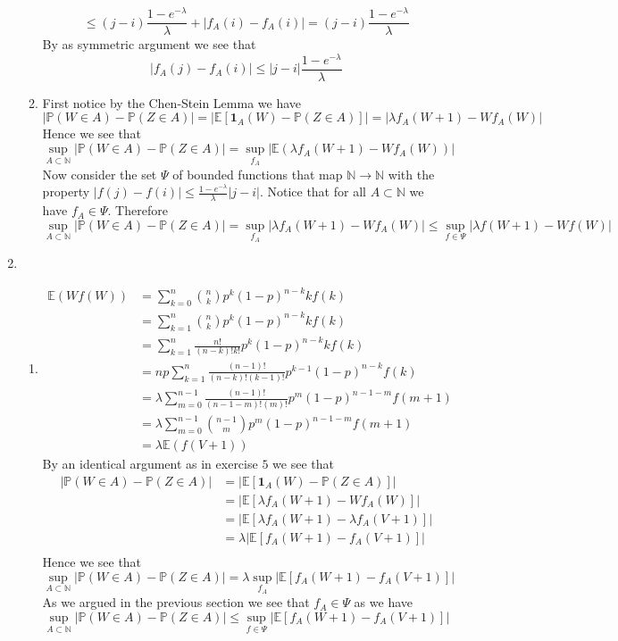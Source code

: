 \documentclass[12pt]{article}  %
\newcommand{\N}{{\mathbb{N}}}
\newcommand{\E}{{\mathbb{E}}}
\newcommand{\prob}{{\mathbb{P}}}
\newcommand{\ind}{{\mathbf{1}}}
\begin{document}
\begin{enumerate}
\begin{enumerate}
$$\leq (j-i)\frac{1-e^{-\lambda}}{\lambda} + |f_A(i)-f_A(i)| = (j-i)\frac{1-e^{-\lambda}}{\lambda}$$
By as symmetric argument we see that $$|f_A(j)-f_A(i)|\leq|j-i|\frac{1-e^{-\lambda}}{\lambda}$$

\item First notice by the Chen-Stein Lemma we have $$|\prob(W\in A)-\prob(Z\in A)| = |\E[\ind_{A}(W)-\prob(Z\in A)]| = |\lambda f_A(W+1)-Wf_A(W)|$$ Hence we see that $$\sup_{A\subset\N}|\prob(W\in A)-\prob(Z\in A)| = \sup_{f_A}|\E(\lambda f_A(W+1)-Wf_A(W))|$$ Now consider the set $\Psi$ of bounded functions that map $\N\to\N$ with the property $|f(j)-f(i)|\leq \frac{1-e^{-\lambda}}{\lambda}|j-i|$. Notice that for all $A\subset\N$ we have $f_A\in\Psi$. Therefore
$$\sup_{A\subset\N}|\prob(W\in A)-\prob(Z\in A)| = \sup_{f_A}|\lambda f_A(W+1)-Wf_A(W)|\leq \sup_{f\in\Psi}|\lambda f(W+1)-Wf(W)|$$ 
\end{enumerate}	
\item 
\begin{enumerate}
\item 
\begin{align*}
\E(Wf(W)) &= \sum_{k=0}^n\binom{n}{k}p^k(1-p)^{n-k}kf(k)\\
&= \sum_{k=1}^n\binom{n}{k}p^k(1-p)^{n-k}kf(k)\\
&= \sum_{k=1}^n\frac{n!}{(n-k)!k!}p^k(1-p)^{n-k}kf(k)\\
&= np\sum_{k=1}^n\frac{(n-1)!}{(n-k)!(k-1)!}p^{k-1}(1-p)^{n-k}f(k)\\
&= \lambda\sum_{m=0}^{n-1}\frac{(n-1)!}{(n-1-m)!(m)!}p^{m}(1-p)^{n-1-m}f(m+1)\\
&= \lambda\sum_{m=0}^{n-1}\binom{n-1}{m}p^{m}(1-p)^{n-1-m}f(m+1)\\
&= \lambda\E(f(V+1))
\end{align*}
By an identical argument as in exercise $5$ we see that 
\begin{align*}
|\prob(W\in A)-\prob(Z\in A)| &= |\E[\ind_{A}(W)-\prob(Z\in A)]|\\ 
&= |\E[\lambda f_A(W+1)-Wf_A(W)]| \\
&= |\E[\lambda f_A(W+1)-\lambda f_A(V+1)]| \\
&= \lambda|\E[ f_A(W+1)-f_A(V+1)]| \\
\end{align*}
Hence we see that 
$$\sup_{A\subset\N}|\prob(W\in A)-\prob(Z\in A)| = \lambda\sup_{f_A}|\E[ f_A(W+1)-f_A(V+1)]|$$
As we argued in the previous section we see that $f_A\in\Psi$  as we have 
$$\sup_{A\subset\N}|\prob(W\in A)-\prob(Z\in A)| \leq \sup_{f\in\Psi}|\E[ f_A(W+1)-f_A(V+1)]|$$

\end{enumerate}
\end{enumerate}
\end{document}
